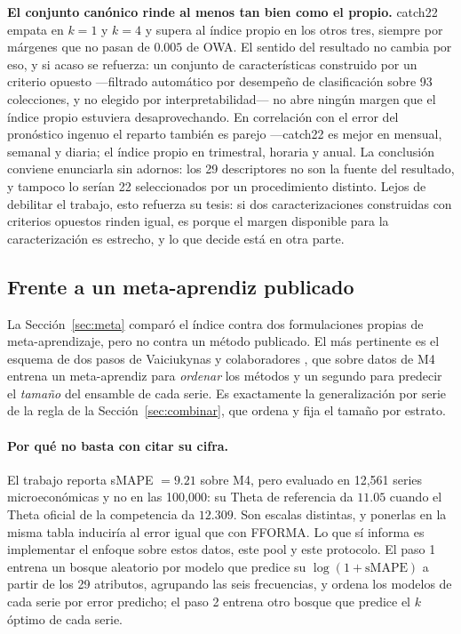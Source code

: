 \textbf{El conjunto canónico rinde al menos tan bien como el propio.} catch22 empata en
$k=1$ y $k=4$ y supera al índice propio en los otros tres, siempre por márgenes que no
pasan de $0.005$ de OWA. El sentido del resultado no cambia por eso, y si acaso se
refuerza: un conjunto de características construido por un criterio opuesto ---filtrado
automático por desempeño de clasificación sobre 93 colecciones, y no elegido por
interpretabilidad--- no abre ningún margen que el índice propio estuviera desaprovechando. En correlación con el error del
pronóstico ingenuo el reparto también es parejo ---catch22 es mejor en mensual, semanal y
diaria; el índice propio en trimestral, horaria y anual. La conclusión conviene enunciarla
sin adornos: los 29 descriptores no son la fuente del resultado, y tampoco lo serían 22
seleccionados por un procedimiento distinto. Lejos de debilitar el trabajo, esto refuerza
su tesis: si dos caracterizaciones construidas con criterios opuestos rinden igual, es
porque el margen disponible para la caracterización es estrecho, y lo que decide está en
otra parte.

\subsection{Frente a un meta-aprendiz publicado}\label{sec:dospasos}

La Sección~\ref{sec:meta} comparó el índice contra dos formulaciones propias de
meta-aprendizaje, pero no contra un método publicado. El más pertinente es el
esquema de dos pasos de Vaiciukynas y colaboradores \cite{vaiciukynas2021}, que
sobre datos de M4 entrena un meta-aprendiz para \emph{ordenar} los métodos y un
segundo para predecir el \emph{tamaño} del ensamble de cada serie. Es exactamente
la generalización por serie de la regla de la Sección~\ref{sec:combinar}, que ordena
y fija el tamaño por estrato.

\paragraph{Por qué no basta con citar su cifra.} El trabajo reporta sMAPE $=9.21$
sobre M4, pero evaluado en 12{,}561 series microeconómicas y no en las 100{,}000: su
Theta de referencia da $11.05$ cuando el Theta oficial de la competencia da $12.309$.
Son escalas distintas, y ponerlas en la misma tabla induciría al error igual que con
FFORMA. Lo que sí informa es implementar el enfoque sobre estos datos, este pool y este
protocolo. El paso 1 entrena un bosque aleatorio por modelo que predice su
$\log(1+\mathrm{sMAPE})$ a partir de los 29 atributos, agrupando las seis frecuencias, y
ordena los modelos de cada serie por error predicho; el paso 2 entrena otro bosque que
predice el $k$ óptimo de cada serie.

